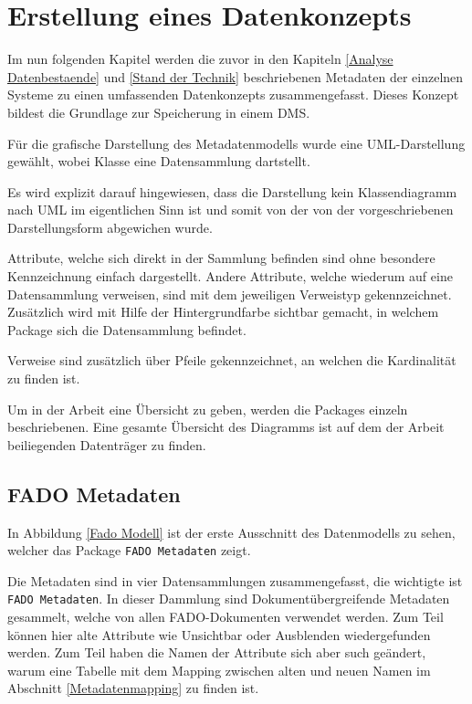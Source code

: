 \section{Erstellung eines Datenkonzepts} \label{Erstellung eines Datenkonzepts}
Im nun folgenden Kapitel werden die zuvor in den Kapiteln \ref{Analyse Datenbestaende} und \ref{Stand der Technik} beschriebenen Metadaten der einzelnen Systeme zu einen umfassenden Datenkonzepts zusammengefasst. Dieses Konzept bildest die Grundlage zur Speicherung in einem \ac{DMS}.

F\"ur die grafische Darstellung des Metadatenmodells wurde eine UML-Darstellung gew\"ahlt, wobei Klasse eine Datensammlung dartstellt. 

Es wird explizit darauf hingewiesen, dass die Darstellung kein Klassendiagramm nach UML im eigentlichen Sinn ist und somit von der von der vorgeschriebenen Darstellungsform abgewichen wurde.

Attribute, welche sich direkt in der Sammlung befinden sind ohne besondere Kennzeichnung einfach dargestellt. Andere Attribute, welche wiederum auf eine Datensammlung verweisen, sind mit dem jeweiligen Verweistyp gekennzeichnet. Zus\"atzlich wird mit Hilfe der Hintergrundfarbe sichtbar gemacht, in welchem Package sich die Datensammlung befindet. 

Verweise sind zus\"atzlich \"uber Pfeile gekennzeichnet, an welchen die Kardinalit\"at zu finden ist.

Um in der Arbeit eine \"Ubersicht zu geben, werden die Packages einzeln beschriebenen. Eine gesamte \"Ubersicht des Diagramms ist auf dem der Arbeit beiliegenden Datentr\"ager zu finden.

\subsection{FADO Metadaten}\label{FADO Metadaten}
In Abbildung \ref{Fado Modell} ist der erste Ausschnitt des Datenmodells zu sehen, welcher das Package \texttt{FADO Metadaten} zeigt.

Die Metadaten sind in vier Datensammlungen zusammengefasst, die wichtigte ist \texttt{FADO Metadaten}. In dieser Dammlung sind Dokument\"ubergreifende Metadaten gesammelt, welche von allen FADO-Dokumenten verwendet werden. Zum Teil k\"onnen hier alte Attribute wie Unsichtbar oder Ausblenden wiedergefunden werden. Zum Teil haben die Namen der Attribute sich aber such ge\"andert, warum eine Tabelle mit dem Mapping zwischen alten und neuen Namen im Abschnitt \ref{Metadatenmapping} zu finden ist.

